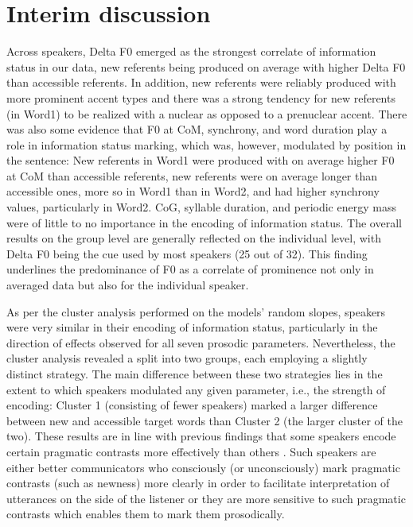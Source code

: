 \section{Interim discussion} \label{sec:Production 1 discussion}

Across speakers, Delta F0 emerged as the strongest correlate of information status in our data, new referents being produced on average with higher Delta F0 than accessible referents. In addition, new referents were reliably produced with more prominent accent types and there was a strong tendency for new referents (in Word1) to be realized with a nuclear as opposed to a prenuclear accent. There was also some evidence that F0 at CoM, synchrony, and word duration play a role in information status marking, which was, however, modulated by position in the sentence: New referents in Word1 were produced with on average higher F0 at CoM than accessible referents, new referents were on average longer than accessible ones, more so in Word1 than in Word2, and had higher synchrony values, particularly in Word2. CoG, syllable duration, and periodic energy mass were of little to no importance in the encoding of information status. The overall results on the group level are generally reflected on the individual level, with Delta F0 being the cue used by most speakers (25 out of 32). This finding underlines the predominance of F0 as a correlate of prominence \citep[e.g.,][]{bolingerTheoryPitchAccent1958, fryExperimentsPerceptionStress1958, liebermanAcousticCorrelatesWord1960, baumannWhatMakesWord2018, roessigTracingPhoneticSpace2022} not only in averaged data but also for the individual speaker.

As per the cluster analysis performed on the models' random slopes, speakers were very similar in their encoding of information status, particularly in the direction of effects observed for all seven prosodic parameters. Nevertheless, the cluster analysis revealed a split into two groups, each employing a slightly distinct strategy. The main difference between these two strategies lies in the extent to which speakers modulated any given parameter, i.e., the strength of encoding: Cluster 1 (consisting of fewer speakers) marked a larger difference between new and accessible target words than Cluster 2 (the larger cluster of the two). These results are in line with previous findings that some speakers encode certain pragmatic contrasts more effectively than others \citep[e.g.,][]{cangemiListenerSpecificPerceptionSpeakerSpecific2015}. Such speakers are either better communicators who consciously (or unconsciously) mark pragmatic contrasts (such as newness) more clearly in order to facilitate interpretation of utterances on the side of the listener or they are more sensitive to such pragmatic contrasts which enables them to mark them prosodically.

